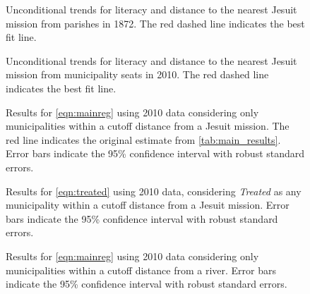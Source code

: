 \begin{figure}[h!]
	\begin{center}
	\end{center}
	\caption{Unconditional trends for literacy and distance to the nearest Jesuit mission from parishes in 1872. The red dashed line indicates the best fit line.}
	\label{fig:Unconditional1872}
\end{figure}

\begin{figure}[h!]
	\begin{center}
	\end{center}
	\caption{Unconditional trends for literacy and distance to the nearest Jesuit mission from municipality seats in 2010. The red dashed line indicates the best fit line.}
	\label{fig:Unconditional2010}
\end{figure}

\begin{figure}[h!]
	\begin{center}
	\end{center}
	\caption{Results for \protect\autoref{eqn:mainreg} using 2010 data considering only municipalities within a cutoff distance from a Jesuit mission. The red line indicates the original estimate from \protect\autoref{tab:main_results}. Error bars indicate the 95\% confidence interval with robust standard errors.}
	\label{fig:JesuitDistances}
\end{figure}

\begin{figure}[h!]
	\begin{center}
	\end{center}
	\caption{Results for \protect\autoref{eqn:treated} using 2010 data, considering \textit{Treated} as any municipality within a cutoff distance from a Jesuit mission. Error bars indicate the 95\% confidence interval with robust standard errors.}
	\label{fig:TreatedDistances}
\end{figure}

\begin{figure}[h!]
	\begin{center}
	\end{center}
	\caption{Results for \protect\autoref{eqn:mainreg} using 2010 data considering only municipalities within a cutoff distance from a river. Error bars indicate the 95\% confidence interval with robust standard errors.}
	\label{fig:RiverDistances}
\end{figure}

